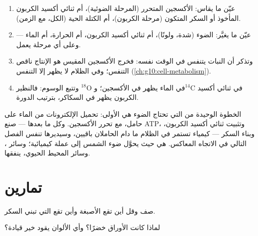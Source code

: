 \begin{method}\label{met:g12:photosynthesis:experiment}
\begin{enumerate}
  \item عيّن ما يقاس: الأكسجين المتحرر (المرحلة الضوئية)، أم ثنائي
        أكسيد الكربون المأخوذ أو السكر المتكون (مرحلة الكربون)، أم
        الكتلة الحية (الكل، مع الزمن).
  \item عيّن ما يغيَّر: الضوء (شدة، ولونًا)، أم ثنائي أكسيد الكربون، أم
        الحرارة، أم الماء --- وعلى أي مرحلة يعمل.
  \item وتذكر أن النبات يتنفس في الوقت نفسه: فخرج الأكسجين المقيس هو
        الإنتاج ناقص التنفس؛ وفي الظلام لا يظهر إلا التنفس
        (\cref{ch:g10:cell-metabolism}).
  \item وتتبع الوسوم: فالنظير $^{18}$O في الماء يظهر في الأكسجين؛ و$^{14}$C
        في ثنائي أكسيد الكربون يظهر في السكاكر، بترتيب الدورة.
\end{enumerate}
\end{method}

\begin{remark}\label{rem:g12:photosynthesis:light}
الخطوة الوحيدة من  التي تحتاج الضوء هي الأولى: تحميل
الإلكترونات من الماء على حامل، مع تحرر الأكسجين. وكل ما بعدها --- صنع
ATP، وتثبيت ثنائي أكسيد الكربون، وبناء السكر --- كيمياء تستمر في
الظلام ما دام الحاملان باقيين، وسيديرها تنفس الفصل التالي في الاتجاه
المعاكس.  هي حيث يحوَّل ضوء الشمس إلى عملة كيميائية؛
وسائر ، وسائر المحيط الحيوي، ينفقها.
\end{remark}

\section{تمارين}

\begin{exercise}[$\star$]\label{exo:g12:photosynthesis:1}
صف  وقل أين تقع الأصبغة وأين تقع  التي تبني
السكر.
\end{exercise}

\begin{exercise}[$\star$]\label{exo:g12:photosynthesis:2}
لماذا كانت الأوراق خضرًا؟ وأي الألوان يقود  خير قيادة؟
\end{exercise}

